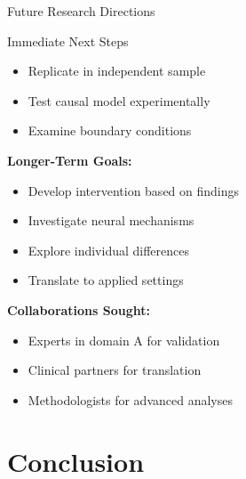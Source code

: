 \documentclass[aspectratio=169,11pt]{beamer}
\begin{document}
\begin{frame}{Future Research Directions}
  \begin{block}{Immediate Next Steps}
    \begin{itemize}
      \item Replicate in independent sample
      \item Test causal model experimentally
      \item Examine boundary conditions
    \end{itemize}
  \end{block}

  \vspace{0.5cm}

  \textbf{Longer-Term Goals:}
  \begin{itemize}
    \item Develop intervention based on findings
    \item Investigate neural mechanisms
    \item Explore individual differences
    \item Translate to applied settings
  \end{itemize}

  \vspace{0.5cm}

  \textbf{Collaborations Sought:}
  \begin{itemize}
    \item Experts in domain A for validation
    \item Clinical partners for translation
    \item Methodologists for advanced analyses
  \end{itemize}
\end{frame}


\section{Conclusion}
\end{document}
